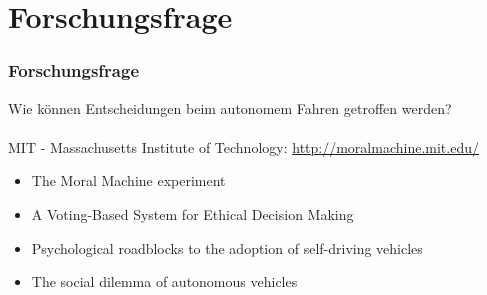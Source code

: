 \section{Forschungsfrage}

\begin{frame}
    \frametitle{Forschungsfrage}

    Wie können Entscheidungen beim autonomem Fahren getroffen werden? \\
    \\ \pause
    MIT - Massachusetts Institute of Technology: \url{http://moralmachine.mit.edu/} \\ \pause

    \begin{itemize}
        \item The Moral Machine experiment \cite{Awad2018}
        \item A Voting-Based System for Ethical Decision Making \cite{DBLP:journals/corr/abs-1709-06692}
        \item Psychological roadblocks to the adoption of self-driving vehicles \cite{Shariff2017}
        \item The social dilemma of autonomous vehicles \cite{Bonnefon1573}
    \end{itemize}
\end{frame}
